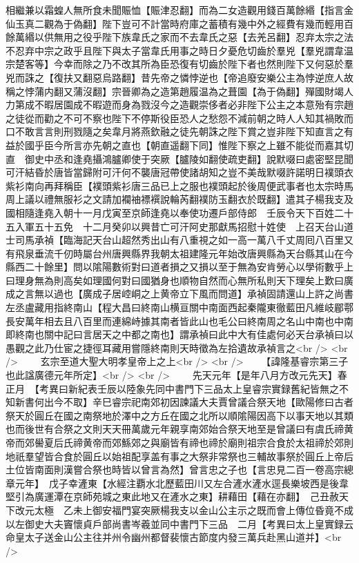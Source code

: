 相繼兼以霜蝗人無所食未聞賑恤【賑津忍翻】而為二女造觀用錢百萬餘緡【指言金仙玉真二觀為于偽翻】陛下豈可不計當時府庫之蓄積有幾中外之經費有幾而輕用百餘萬緡以供無用之役乎陛下族韋氏之家而不去韋氏之惡【去羌呂翻】忍弃太宗之法不忍弃中宗之政乎且陛下與太子當韋氏用事之時日夕憂危切齒於羣兇【羣兇謂韋温宗楚客等】今幸而除之乃不改其所為臣恐復有切齒於陛下者也然則陛下又何惡於羣兇而誅之【復扶又翻惡烏路翻】昔先帝之憐悖逆也【帝追廢安樂公主為悖逆庶人故稱之悖蒲内翻又蒲沒翻】宗晉卿為之造第趙履温為之葺園【為于偽翻】殫國財竭人力第成不暇居園成不暇遊而身為戮沒今之造觀崇侈者必非陛下公主之本意殆有宗趙之徒從而勸之不可不察也陛下不停斯役臣恐人之愁怨不減前朝之時人人知其禍敗而口不敢言言則刑戮隨之矣韋月將燕欽融之徒先朝誅之陛下賞之豈非陛下知直言之有益於國乎臣今所言亦先朝之直也【朝直遥翻下同】惟陛下察之上雖不能從而嘉其切直　御史中丞和逢堯攝鴻臚卿使于突厥【臚陵如翻使疏吏翻】說默啜曰處密堅昆聞可汗結昏於唐皆當歸附可汗何不襲唐冠帶使諸胡知之豈不美哉默啜許諾明日襆頭衣紫衫南向再拜稱臣【襆頭紫衫唐三品已上之服也襆頭起於後周便武事者也太宗時馬周上議以禮無服衫之文請加襴䄂褾襈說輪芮翻襆防玉翻衣於既翻】遣其子楊我支及國相隨逢堯入朝十一月戊寅至京師逢堯以奉使功遷戶部侍郎　壬辰令天下百姓二十五入軍五十五免　十二月癸卯以興昔亡可汗阿史那獻馬招慰十姓使　上召天台山道士司馬承禎【臨海記天台山超然秀出山有八重視之如一高一萬八千丈周囘八百里又有飛泉垂流千仞時屬台州唐興縣界我朝太祖建隆元年始改唐興縣為天台縣其山在今縣西二十餘里】問以隂陽數術對曰道者損之又損以至于無為安肯勞心以學術數乎上曰理身無為則高矣如理國何對曰國猶身也順物自然而心無所私則天下理矣上歎曰廣成之言無以過也【廣成子居崆峒之上黄帝立下風而問道】承禎固請還山上許之尚書左丞盧藏用指終南山【程大昌曰終南山横亘關中南面西起秦隴東徹藍田凡維岐郿鄠長安萬年相去且八百里而連綿峙據其南者皆此山也毛公曰終南周之名山中南也中南即終南也關中記曰言居天之中都之南也】謂承禎曰此中大有佳處何必天台承禎曰以愚觀之此乃仕宦之捷徑耳藏用嘗隱終南則天時徵為左拾遺故承禎言之<br />
<br />
　　玄宗至道大聖大明孝皇帝上之上<br />
<br />
　　【諱隆基睿宗第三子也此諡廣德元年所定】<br />
<br />
　　先天元年【是年八月方改元先天】春正月　【考異曰新紀表壬辰以陸象先同中書門下三品太上皇睿宗實録舊紀皆無之不知新書何出今不取】辛巳睿宗祀南郊初因諫議大夫賈曾議合祭天地【歐陽修曰古者祭天於圓丘在國之南祭地於澤中之方丘在國之北所以順隂陽因高下以事天地以其類也而後世有合祭之文則天天冊萬歲元年親享南郊始合祭天地至是曾議曰有虞氏禘黄帝而郊嚳夏后氏禘黄帝而郊鯀郊之與廟皆有禘也禘於廟則祖宗合食於太祖禘於郊則地祇羣望皆合食於圓丘以始祖配享盖有事之大祭非常祭也三輔故事祭於圓丘上帝后土位皆南面則漢嘗合祭也時皆以曾言為然】曾言忠之子也【言忠見二百一卷高宗總章元年】　戊子幸滻東【水經注覇水北歷藍田川又左合滻水滻水逕長樂坡西是後韋堅引為廣運潭在京師苑城之東此地又在滻水之東】耕藉田【藉在亦翻】　己丑赦天下改元太極　乙未上御安福門宴突厥楊我支以金山公主示之既而會上傳位昏竟不成　以左御史大夫竇懷貞戶部尚書岑羲並同中書門下三品　二月【考異曰太上皇實録云命皇太子送金山公主往并州令幽州都督裴懷古節度内發三萬兵赴黑山道并】<br />
